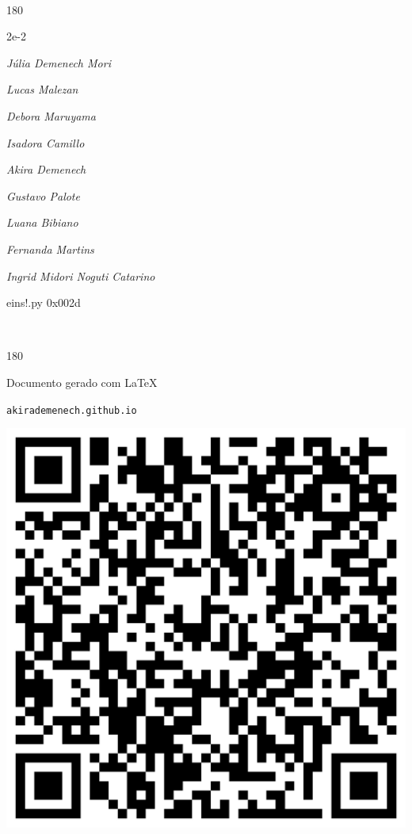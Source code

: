 \documentclass[12pt]{article}
\begin{document}
\pagebreak			

	\ 
	\vfill
	\begin{turn}{180}	
		\begin{minipage}{\textwidth}
		  	\ttfamily %
			\centering
			{\Huge 2e-2}
		  
			\hfill
		  
			

\textit{\small Júlia Demenech Mori}

\textit{\small Lucas Malezan}

\textit{\small Debora Maruyama}

\textit{\small Isadora Camillo}

\textit{\small Akira Demenech}

\textit{\small Gustavo Palote}

\textit{\small Luana Bibiano}

\textit{\small Fernanda Martins}

\textit{\small Ingrid Midori Noguti Catarino}

\bigskip

eins!.py
0x002d


		\end{minipage}	
	\end{turn}
	\vfill
	\

\pagebreak

	\begin{turn}{180}	
		\begin{minipage}{\textwidth}		  
		  Documento gerado com \LaTeX			
		  
		  \texttt{akirademenech.github.io}

		  \includegraphics[height=0.3\textheight]{2e-2.pdf}

		\end{minipage}	
	\end{turn}  
		  
\end{document}
